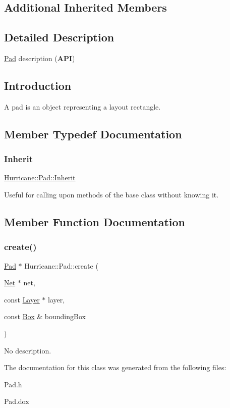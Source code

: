 \subsection*{Additional Inherited Members}


\subsection{Detailed Description}
\mbox{\hyperlink{classHurricane_1_1Pad}{Pad}} description ({\bfseries A\+PI}) 

\hypertarget{classHurricane_1_1Pad_secPadIntro}{}\subsection{Introduction}\label{classHurricane_1_1Pad_secPadIntro}
A pad is an object representing a layout rectangle. 

\subsection{Member Typedef Documentation}
\mbox{\label{classHurricane_1_1Pad_aa44130a291ce3cb878d749fbf3e5437e}} 
\subsubsection{\texorpdfstring{Inherit}{Inherit}}
{\footnotesize\ttfamily \mbox{\hyperlink{classHurricane_1_1Pad_aa44130a291ce3cb878d749fbf3e5437e}{Hurricane\+::\+Pad\+::\+Inherit}}}

Useful for calling upon methods of the base class without knowing it. 

\subsection{Member Function Documentation}
\mbox{\label{classHurricane_1_1Pad_a0fdf586f9f815d375f54b40bfa027b24}} 
\subsubsection{\texorpdfstring{create()}{create()}}
{\footnotesize\ttfamily \mbox{\hyperlink{classHurricane_1_1Pad}{Pad}} $\ast$ Hurricane\+::\+Pad\+::create (\begin{DoxyParamCaption}\item[{\mbox{\hyperlink{classHurricane_1_1Net}{Net}} $\ast$}]{net,  }\item[{const \mbox{\hyperlink{classHurricane_1_1Layer}{Layer}} $\ast$}]{layer,  }\item[{const \mbox{\hyperlink{classHurricane_1_1Box}{Box}} \&}]{bounding\+Box }\end{DoxyParamCaption})\hspace{0.3cm}{\ttfamily [static]}}

No description. 

The documentation for this class was generated from the following files\+:\begin{DoxyCompactItemize}
\item 
Pad.\+h\item 
Pad.\+dox\end{DoxyCompactItemize}
